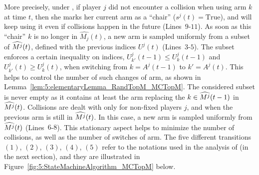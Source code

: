 More precisely, under \MCTopM,
if player $j$ did not encounter a collision when using arm $k$ at time $t$,
then she marks her current arm as a ``chair'' ($s^j(t)=\mathrm{True}$),
and will keep using it even if collisions happen in the future (Lines~$9$-$11$).
%
As soon as this ``chair'' $k$ is no longer in $\widehat{M_j}(t)$,
a new arm is sampled uniformly from a subset of $\widehat{M^j}(t)$,
defined with the previous indices $U^j(t)$ (Lines~$3$-$5$).
%
The subset enforces a certain inequality on indices,
$U_{k'}^j(t-1) \leq U^j_{k}(t-1)$ and $U_{k'}^j(t) \geq U^j_{k}(t)$,
when switching from $k=A^j(t-1)$ to $k'=A^j(t)$.
This helps to control the number of such changes of arm,
as shown in Lemma~\ref{lem:5:elementaryLemma_RandTopM_MCTopM}.
The considered subset is never empty as it contains
at least the arm replacing the $k\in\widehat{M^j}(t-1)$ in $\widehat{M^j}(t)$.
Collisions are dealt with only for non-fixed players $j$,
and when the previous arm is still in $\widehat{M^j}(t)$.
%
In this case, a new arm is sampled uniformly from $\widehat{M^j}(t)$ (Lines~$6$-$8$).
%
%
This stationary aspect helps to minimize the number of collisions,
as well as the number of switches of arm.
%
The five different transitions $(1)$, $(2)$, $(3)$, $(4)$, $(5)$ refer to the notations used in the analysis of \MCTopM{} (in the next section), and they are illustrated in Figure~\ref{fig:5:StateMachineAlgorithm_MCTopM} below.

